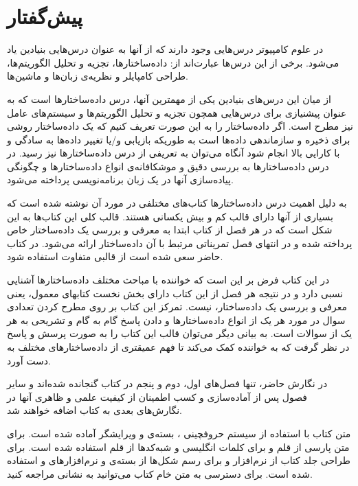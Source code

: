 \section*{پیش‌گفتار}
در علوم کامپیوتر درس‌هایی وجود دارند که از آنها به عنوان درس‌هایی بنیادین یاد می‌شود. برخی از این درس‌ها عبارت‌اند از: داده‌ساختارها، تجزیه و تحلیل الگوریتم‌ها، طراحی کامپایلر و نظریه‌ی زبان‌ها و ماشین‌ها.

از میان این درس‌های بنیادین یکی از مهمترین آنها، درس داده‌ساختارها است که به عنوان پیشنیازی برای درس‌هایی همچون تجزیه و تحلیل الگوریتم‌ها و سیستم‌های عامل نیز مطرح است. اگر داده‌ساختار را به این صورت تعریف کنیم که {\prq}یک داده‌ساختار روشی برای ذخیره و سازماندهی داده‌ها است به طوریکه بازیابی و/یا تغییر داده‌ها به سادگی و با کارایی بالا انجام شود{\plq} آنگاه می‌توان به تعریفی از درس داده‌ساختارها نیز رسید. در درس داده‌ساختارها به بررسی دقیق و موشکافانه‌ی انواع داده‌ساختارها و چگونگی پیاده‌سازی آنها در یک زبان برنامه‌نویسی پرداخته می‌شود.

به دلیل اهمیت درس داده‌ساختارها کتاب‌های مختلفی در مورد آن نوشته شده است که بسیاری از آنها دارای قالب کم و بیش یکسانی هستند. قالب کلی این کتاب‌ها به این شکل است که در هر فصل از کتاب ابتدا به معرفی و بررسی یک داده‌ساختار خاص پرداخته شده و در انتهای فصل تمریناتی مرتبط با آن داده‌ساختار ارائه می‌شود. در کتاب حاضر سعی شده است از قالبی متفاوت استفاده شود.

در این کتاب فرض بر این است که خواننده با مباحث مختلف داده‌ساختارها آشنایی نسبی دارد و در نتیجه هر فصل از این کتاب دارای بخش نخست کتابهای معمول، یعنی معرفی و بررسی یک داده‌ساختار، نیست. تمرکز این کتاب بر روی مطرح کردن تعدادی سوال در مورد هر یک از انواع داده‌ساختارها و دادن پاسخ گام به گام و تشریحی به هر یک از سوالات است. به بیانی دیگر می‌توان قالب این کتاب را به صورت پرسش و پاسخ در نظر گرفت که به خواننده کمک می‌کند تا فهم عمیقتری از داده‌ساختارهای مختلف به دست آورد.

در نگارش حاضر، تنها فصل‌های اول، دوم و پنجم در کتاب گنجانده شده‌اند و سایر فصول پس از آماده‌سازی و کسب اطمینان از کیفیت علمی و ظاهری آنها در نگارش‌های بعدی به کتاب اضافه خواهند شد.

متن کتاب با استفاده از سیستم حروفچینی {\lr{\LaTeX}}، بسته‌ی {\lr{\XePersian}} و ویرایشگر {} آماده شده است. برای متن پارسی از قلم {} و برای کلمات انگلیسی و شبه‌کدها از قلم {} استفاده شده است. برای طراحی جلد کتاب از نرم‌افزار {} و برای رسم شکل‌ها از بسته‌ی {} و نرم‌افزارهای {} و {} استفاده شده است. برای دسترسی به متن خام کتاب می‌توانید به نشانی {} مراجعه کنید.


